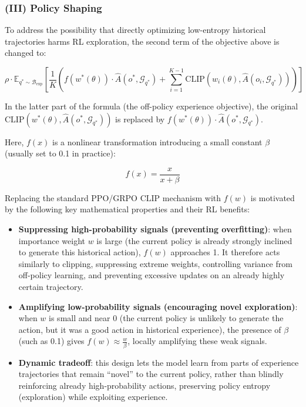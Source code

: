\hypertarget{iii-policy-shaping}{%
\subsubsection{(III) Policy Shaping}\label{iii-policy-shaping}}

To address the possibility that directly optimizing low-entropy historical trajectories harms RL exploration, the second term of the objective above is changed to:

\[
\rho\cdot
\mathbb{E}_{q^{\ast}\sim\mathcal{B}_{\mathrm{exp}}}
\left[
\frac{1}{K}
\left(
f\left(w^{\ast}(\theta)\right)\cdot\hat{A}(o^{\ast},\mathcal{G}_{q^{\ast}})
+\sum_{i=1}^{K-1}
\mathrm{CLIP}\left(w_i(\theta),\hat{A}(o_i,\mathcal{G}_{q^{\ast}})\right)
\right)
\right]
\]

In the latter part of the formula (the off-policy experience objective), the original \(\mathrm{CLIP}\left(w^{\ast}(\theta),\hat{A}(o^{\ast},\mathcal{G}_{q^{\ast}})\right)\) is replaced by \(f\left(w^{\ast}(\theta)\right)\cdot\hat{A}(o^{\ast},\mathcal{G}_{q^{\ast}})\).

Here, \(f(x)\) is a nonlinear transformation introducing a small constant \(\beta\) (usually set to 0.1 in practice):

\[
f(x)=\frac{x}{x+\beta}
\]

Replacing the standard PPO/GRPO \(\mathrm{CLIP}\) mechanism with \(f(w)\) is motivated by the following key mathematical properties and their RL benefits:

\begin{itemize}
\tightlist
\item
  \textbf{Suppressing high-probability signals (preventing overfitting)}: when importance weight \(w\) is large (the current policy is already strongly inclined to generate this historical action), \(f(w)\) approaches 1. It therefore acts similarly to clipping, suppressing extreme weights, controlling variance from off-policy learning, and preventing excessive updates on an already highly certain trajectory.
\item
  \textbf{Amplifying low-probability signals (encouraging novel exploration)}: when \(w\) is small and near 0 (the current policy is unlikely to generate the action, but it was a good action in historical experience), the presence of \(\beta\) (such as 0.1) gives \(f(w)\approx\frac{w}{\beta}\), locally amplifying these weak signals.
\item
  \textbf{Dynamic tradeoff}: this design lets the model learn from parts of experience trajectories that remain ``novel'' to the current policy, rather than blindly reinforcing already high-probability actions, preserving policy entropy (exploration) while exploiting experience.
\end{itemize}

